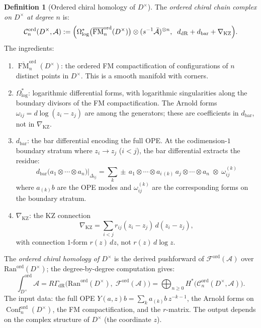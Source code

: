 \documentclass[11pt,reqno]{amsart}
\theoremstyle{definition}
\newtheorem{definition}[theorem]{Definition}
\theoremstyle{remark}
\newcommand{\cA}{\mathcal{A}}
\newcommand{\cC}{\mathcal{C}}
\newcommand{\cF}{\mathcal{F}}
\newcommand{\Ran}{\mathrm{Ran}}
\DeclareMathOperator{\Conf}{Conf}
\DeclareMathOperator{\FM}{FM}
\numberwithin{equation}{section}
\begin{document}
\begin{definition}[Ordered chiral homology of $D^\times$]
\label{def:ch-hom-Dx}
The \emph{ordered chiral chain complex on $D^\times$ at
degree $n$} is:
\begin{equation}\label{eq:ch-chain-Dx}
  \cC_n^{\mathrm{ord}}(D^\times, \cA)
  := \Bigl(
  \Omega^*_{\log}\bigl(
  \overline{\FM}_n^{\mathrm{ord}}(D^\times)\bigr)
  \otimes (s^{-1}\bar{\cA})^{\otimes n},
  \;\; d_{\mathrm{dR}} + d_{\mathrm{bar}}
  + \nabla_{\mathrm{KZ}}
  \Bigr).
\end{equation}
The ingredients:
\begin{enumerate}[label=\textup{(\alph*)}]
\item $\overline{\FM}_n^{\mathrm{ord}}(D^\times)$:
  the ordered FM compactification of configurations
  of $n$ distinct points in $D^\times$. This is a smooth
  manifold with corners.
\item $\Omega^*_{\log}$:
  logarithmic differential forms, with logarithmic
  singularities along the boundary divisors of the FM
  compactification. The Arnold forms
  $\omega_{ij} = d\log(z_i - z_j)$ are among the
  generators; these are coefficients in $d_{\mathrm{bar}}$,
  not in $\nabla_{\mathrm{KZ}}$.
\item $d_{\mathrm{bar}}$:
  the bar differential encoding the full OPE. At the
  codimension-$1$ boundary stratum where $z_i \to z_j$
  ($i < j$), the bar differential extracts the residue:
  \begin{equation}\label{eq:bar-diff}
    d_{\mathrm{bar}}
    \bigl(a_1 \otimes \cdots \otimes a_n\bigr)
    \big|_{\Delta_{ij}}
    = \sum_k \pm\,
    a_1 \otimes \cdots \otimes a_{i\,(k)}\, a_j
    \otimes \cdots \otimes a_n
    \;\otimes\; \omega_{ij}^{(k)}
  \end{equation}
  where $a_{(k)} b$ are the OPE modes and
  $\omega_{ij}^{(k)}$ are the corresponding forms on the
  boundary stratum.
\item $\nabla_{\mathrm{KZ}}$:
  the KZ connection
  \begin{equation}\label{eq:kz-Dx}
    \nabla_{\mathrm{KZ}} = \sum_{i < j}
    r_{ij}(z_i - z_j)\, d(z_i - z_j),
  \end{equation}
  with connection $1$-form $r(z)\,dz$, not
  $r(z)\,d\log z$.
\end{enumerate}
The \emph{ordered chiral homology of $D^\times$} is the
derived pushforward of $\cF^{\mathrm{ord}}(\cA)$ over
$\Ran^{\mathrm{ord}}(D^\times)$; the degree-by-degree
computation gives:
\begin{equation}\label{eq:ch-hom-Dx}
  \int_{D^\times}^{\mathrm{ord}} \cA
  = R\Gamma_{\mathrm{dR}}\bigl(
  \Ran^{\mathrm{ord}}(D^\times),\;
  \cF^{\mathrm{ord}}(\cA)\bigr)
  = \bigoplus_{n \geq 0}
  H^*\bigl(\cC_n^{\mathrm{ord}}(D^\times, \cA)\bigr).
\end{equation}
The input data: the full OPE
$Y(a,z)b = \sum_k a_{(k)}b \, z^{-k-1}$, the Arnold
forms on $\Conf_n^{\mathrm{ord}}(D^\times)$, the FM
compactification, and the $r$-matrix. The output depends
on the complex structure of $D^\times$ \textup{(}the
coordinate $z$\textup{)}.
\end{definition}
\end{document}

